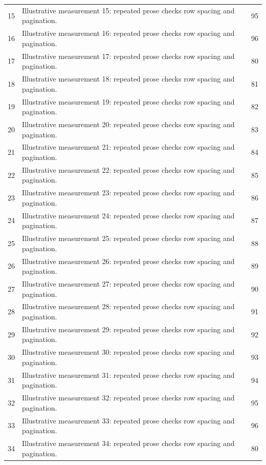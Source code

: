 \documentclass[algorithms,listings]{tempusreport}
\begin{document}
\begin{longtable}{@{}r >{\raggedright\arraybackslash}p{.62\linewidth} r@{}}
15 & Illustrative measurement 15: repeated prose checks row spacing and pagination. & 95 \\
16 & Illustrative measurement 16: repeated prose checks row spacing and pagination. & 96 \\
17 & Illustrative measurement 17: repeated prose checks row spacing and pagination. & 80 \\
18 & Illustrative measurement 18: repeated prose checks row spacing and pagination. & 81 \\
19 & Illustrative measurement 19: repeated prose checks row spacing and pagination. & 82 \\
20 & Illustrative measurement 20: repeated prose checks row spacing and pagination. & 83 \\
21 & Illustrative measurement 21: repeated prose checks row spacing and pagination. & 84 \\
22 & Illustrative measurement 22: repeated prose checks row spacing and pagination. & 85 \\
23 & Illustrative measurement 23: repeated prose checks row spacing and pagination. & 86 \\
24 & Illustrative measurement 24: repeated prose checks row spacing and pagination. & 87 \\
25 & Illustrative measurement 25: repeated prose checks row spacing and pagination. & 88 \\
26 & Illustrative measurement 26: repeated prose checks row spacing and pagination. & 89 \\
27 & Illustrative measurement 27: repeated prose checks row spacing and pagination. & 90 \\
28 & Illustrative measurement 28: repeated prose checks row spacing and pagination. & 91 \\
29 & Illustrative measurement 29: repeated prose checks row spacing and pagination. & 92 \\
30 & Illustrative measurement 30: repeated prose checks row spacing and pagination. & 93 \\
31 & Illustrative measurement 31: repeated prose checks row spacing and pagination. & 94 \\
32 & Illustrative measurement 32: repeated prose checks row spacing and pagination. & 95 \\
33 & Illustrative measurement 33: repeated prose checks row spacing and pagination. & 96 \\
34 & Illustrative measurement 34: repeated prose checks row spacing and pagination. & 80 \\

\end{longtable}
\end{document}
